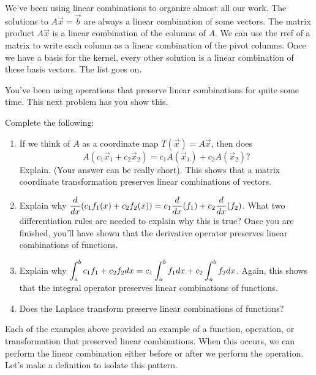 





















\mysubsection{\idealin}

We've been using linear combinations to organize almost all our work.  The solutions to $A\vec x = \vec b$ are always a linear combination of some vectors.  The matrix product $A\vec x$ is a linear combination of the columns of $A$.  We can use the rref of a matrix to write each column as a linear combination of the pivot columns. Once we have a basis for the kernel, every other solution is a linear combination of these basis vectors.  The list goes on.

You've been using operations that preserve linear combinations for quite some time.  This next problem has you show this.
\begin{problem} Complete the following:\label{linear function examples}
\begin{enumerate}
 \item If we think of $A$ as a coordinate map $T(\vec x) = A\vec x$, then does $$A(c_1\vec x_1+c_2\vec x_2) = c_1A(\vec x_1)+c_2A(\vec x_2)?$$ Explain. (Your answer can be really short). This shows that a matrix coordinate transformation preserves linear combinations of vectors. 
 \item Explain why $\displaystyle\frac{d}{dx}(c_1f_1(x)+c_2f_2(x)) = c_1\frac{d}{dx}(f_1)+c_2\frac{d}{dx}(f_2)$. What two differentiation rules are needed to explain why this is true?  Once you are finished, you'll have shown that the derivative operator preserves linear combinations of functions.
 \item Explain why $\displaystyle \int_a^b c_1f_1+c_2f_2 dx = c_1\int_a^b f_1dx+c_2\int_a^b f_2dx$. Again, this shows that the integral operator preserves linear combinations of functions.
 \item Does the Laplace transform preserve linear combinations of functions?
\end{enumerate}

\end{problem}

Each of the examples above provided an example of a function, operation, or transformation that preserved linear combinations. When this occurs, we can perform the linear combination either before or after we perform the operation.  Let's make a definition to isolate this pattern. 

